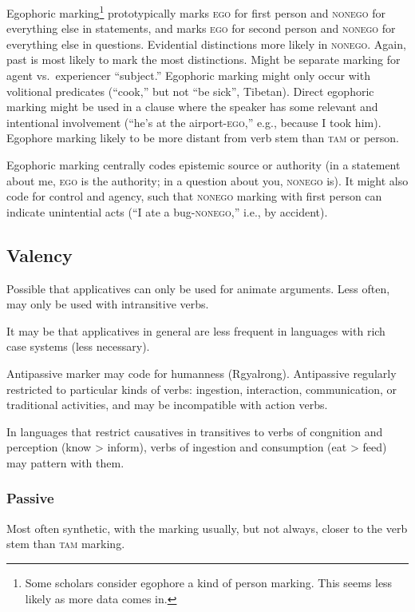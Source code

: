 \documentclass[11pt]{article}
\newcommand{\I}[1]{\textsc{#1}}   %
\begin{document}
{Egophoric marking\footnote{Some scholars consider egophore a kind of
person marking.  This seems less likely as more data comes in.}
prototypically marks \I{ego} for first person and \I{nonego} for
everything else in statements, and marks \I{ego} for second person and
\I{nonego} for everything else in questions.  Evidential distinctions
more likely in \I{nonego}.  Again, past is most likely to mark the
most distinctions.  Might be separate marking for agent
vs.\ experiencer ``subject.''  Egophoric marking might only occur with
volitional predicates (``cook,'' but not ``be sick'', Tibetan).
Direct egophoric marking might be used in a clause where the speaker
has some relevant and intentional involvement (``he's at the
airport-\I{ego},'' e.g., because I took him).  Egophore marking likely
to be more distant from verb stem than \I{tam} or person.

Egophoric marking centrally codes epistemic source or authority (in a
statement about me, \I{ego} is the authority; in a question about you,
\I{nonego} is).  It might also code for control and agency, such that
\I{nonego} marking with first person can indicate unintential acts
(``I ate a bug-\I{nonego},'' i.e., by accident).


\subsection{Valency}
Possible that applicatives can only be used for animate arguments.
Less often, may only be used with intransitive verbs.

It may be that applicatives in general are less frequent in languages
with rich case systems (less necessary).

Antipassive marker may code for humanness (Rgyalrong).  Antipassive
regularly restricted to particular kinds of verbs: ingestion,
interaction, communication, or traditional activities, and may be
incompatible with action verbs.

In languages that restrict causatives in transitives to verbs of
congnition and perception (know > inform), verbs of ingestion and
consumption (eat > feed) may pattern with them.

\subsubsection{Passive} Most often synthetic, with the marking usually,
but not always, closer to the verb stem than \I{tam} marking.

}
\end{document}
